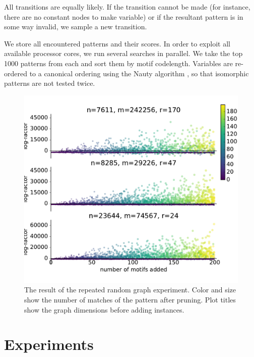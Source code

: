 \documentclass[runningheads]{style/llncs}
\begin{document}
All transitions are equally likely. If the transition cannot be made (for instance, there are no constant nodes to make variable) or if the resultant pattern is in some way invalid, we sample a new transition.


We store all encountered patterns and their scores. In order to exploit all available processor cores, we run several searches in parallel. We take the top 1000 patterns from each and sort them by motif codelength. Variables are re-ordered to a canonical ordering using the Nauty algorithm \cite{mckay1981practical}, so that isomorphic patterns are not tested twice.
 
 \begin{figure}[tb]
  \centering
    \includegraphics[width=0.9\linewidth]{synthrep-plot.pdf}
    \caption{The result of the repeated random graph experiment. Color and size show the number of matches of the pattern after pruning. Plot titles show the graph dimensions before adding instances.}
    \label{figure:synthrep}
\end{figure}
\section{Experiments}
\end{document}
